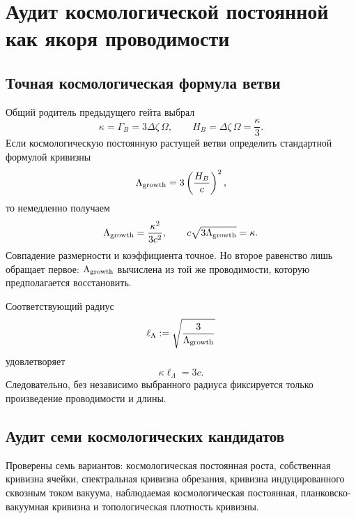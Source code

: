 \chapter{Аудит космологической постоянной как якоря проводимости}
\label{ch:v10-cosmological-conductance-anchor-audit}

\section{Точная космологическая формула ветви}

Общий родитель предыдущего гейта выбрал
\begin{equation}
 \kappa=\Gamma_B=3\Delta\zeta\,\Omega,
 \qquad H_B=\Delta\zeta\,\Omega=\frac{\kappa}{3}.
 \label{eq:v10-lambda-anchor-rate-chain}
\end{equation}
Если космологическую постоянную растущей ветви определить стандартной
формулой кривизны
\begin{equation}
 \Lambda_{\rm growth}=3\left(\frac{H_B}{c}\right)^2,
 \label{eq:v10-lambda-anchor-definition}
\end{equation}
то немедленно получаем
\begin{equation}
 \Lambda_{\rm growth}=\frac{\kappa^2}{3c^2},
 \qquad
 c\sqrt{3\Lambda_{\rm growth}}=\kappa.
 \label{eq:v10-lambda-anchor-tautology}
\end{equation}
Совпадение размерности и коэффициента точное. Но второе равенство лишь
обращает первое: $\Lambda_{\rm growth}$ вычислена из той же проводимости,
которую предполагается восстановить.

Соответствующий радиус
\begin{equation}
 \ell_\Lambda:=\sqrt{\frac{3}{\Lambda_{\rm growth}}}
\end{equation}
удовлетворяет
\begin{equation}
 \kappa\ell_\Lambda=3c.
 \label{eq:v10-lambda-anchor-radius-product}
\end{equation}
Следовательно, без независимо выбранного радиуса фиксируется только
произведение проводимости и длины.

\section{Аудит семи космологических кандидатов}

Проверены семь вариантов: космологическая постоянная роста, собственная
кривизна ячейки, спектральная кривизна обрезания, кривизна индуцированного
сквозным током вакуума, наблюдаемая космологическая постоянная,
планковско-вакуумная кривизна и топологическая плотность кривизны.

